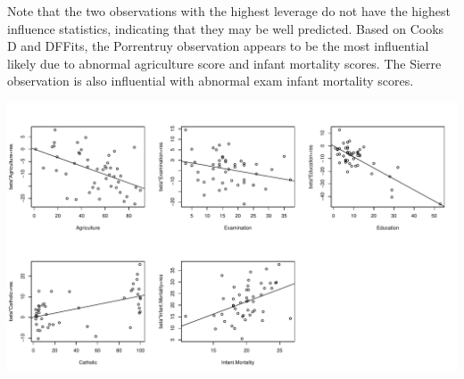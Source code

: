 \documentclass{homework}
\begin{document}
\begin{longproblem}
Note that the two observations with the highest leverage do not have
the highest influence statistics, indicating that they may be well
predicted.  Based on Cooks D and DFFits, the Porrentruy observation
appears to be the most influential  likely due to abnormal agriculture score and infant mortality scores.  The Sierre observation
is also influential with abnormal exam infant mortality scores.   


\includegraphics[width=\textwidth]{partial_residual_plots1.pdf}
\end{longproblem}
\end{document}
